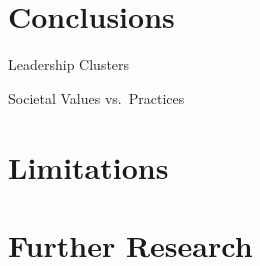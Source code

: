 \documentclass[
  ignorenonframetext,
]{beamer}
\begin{document}
\hypertarget{conclusions}{%
\section{Conclusions}\label{conclusions}}

\begin{frame}{Leadership Clusters}
\protect\hypertarget{leadership-clusters}{}
\end{frame}

\begin{frame}{Societal Values vs.~Practices}
\protect\hypertarget{societal-values-vs.-practices-1}{}
\end{frame}

\hypertarget{limitations}{%
\section{Limitations}\label{limitations}}

\hypertarget{further-research}{%
\section{Further Research}\label{further-research}}
\end{document}
